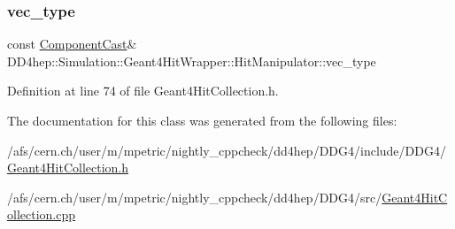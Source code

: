 \hypertarget{class_d_d4hep_1_1_simulation_1_1_geant4_hit_wrapper_1_1_hit_manipulator_abe16127974bebf369e7719b4e72c0647}{}\label{class_d_d4hep_1_1_simulation_1_1_geant4_hit_wrapper_1_1_hit_manipulator_abe16127974bebf369e7719b4e72c0647} 
\subsubsection{\texorpdfstring{vec\+\_\+type}{vec\_type}}
{\footnotesize\ttfamily const \hyperlink{class_d_d4hep_1_1_component_cast}{Component\+Cast}\& D\+D4hep\+::\+Simulation\+::\+Geant4\+Hit\+Wrapper\+::\+Hit\+Manipulator\+::vec\+\_\+type}



Definition at line 74 of file Geant4\+Hit\+Collection.\+h.



The documentation for this class was generated from the following files\+:\begin{DoxyCompactItemize}
\item 
/afs/cern.\+ch/user/m/mpetric/nightly\+\_\+cppcheck/dd4hep/\+D\+D\+G4/include/\+D\+D\+G4/\hyperlink{_geant4_hit_collection_8h}{Geant4\+Hit\+Collection.\+h}\item 
/afs/cern.\+ch/user/m/mpetric/nightly\+\_\+cppcheck/dd4hep/\+D\+D\+G4/src/\hyperlink{_geant4_hit_collection_8cpp}{Geant4\+Hit\+Collection.\+cpp}\end{DoxyCompactItemize}
